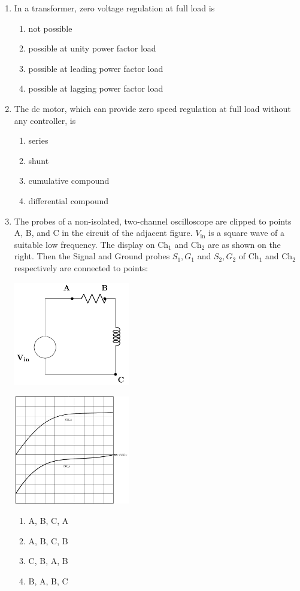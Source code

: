 \documentclass[journal,12pt,onecolumn]{IEEEtran}
\theoremstyle{remark}
\begin{document}
\begin{enumerate}
    \item In a transformer, zero voltage regulation at full load is 
    \begin{enumerate}
\item not possible 
\item possible at unity power factor load 
\item possible at leading power factor load 
\item possible at lagging power factor load\\
\end{enumerate}
\item The dc motor, which can provide zero speed regulation at full load without any
controller, is 
\begin{enumerate} \item series \item shunt \item cumulative compound \item differential compound\\
\end{enumerate}
\item  The probes of a non-isolated, two-channel oscilloscope are clipped to points A, B, and C in the circuit of the adjacent figure. $V_{\text{in}}$ is a square wave of a suitable low frequency. The display on $\text{Ch}_1 $ and $\text{Ch}_2$ are as shown on the right. Then the Signal and Ground probes $ S_1, G_1 $ and $ S_2, G_2 $ of $ \text{Ch}_1 $ and $ \text{Ch}_2 $respectively are connected to points: 
		 \begin{center}
\includegraphics[width=0.4\textwidth]{figs/fig9/fig9.1/main} %
\end{center}
	 \begin{center}
\includegraphics[width=0.4\textwidth]{figs/fig9/9.2/main} %
\end{center}


\begin{enumerate}
    \item A, B, C, A
    \item A, B, C, B
    \item C, B, A, B
    \item B, A, B, C
\end{enumerate}
\end{enumerate}
\end{document}
